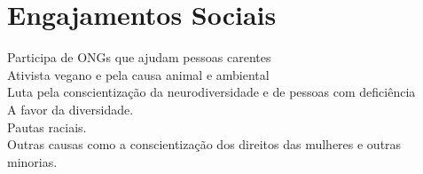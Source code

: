 \section{Engajamentos Sociais}
    \begin{itemize}[leftmargin=0.15in, label={}]
	\small{\item{
                \textbf{}{Participa de ONGs que ajudam pessoas carentes} \\
		\textbf{}{Ativista vegano e pela causa animal e ambiental} \\
		\textbf{}{Luta pela conscientização da neurodiversidade e de pessoas com deficiência } \\
		\textbf{}{A favor da diversidade.} \\
  		\textbf{}{Pautas raciais.} \\
        \textbf{}{Outras causas como a conscientização dos direitos das mulheres e outras minorias.}
	}}
    \end{itemize}
